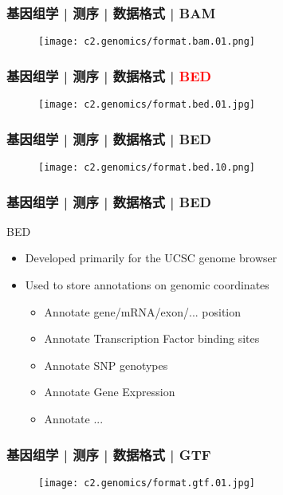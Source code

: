 \begin{frame}
  \frametitle{基因组学 | 测序 | 数据格式 | BAM}
  \begin{figure}
    \centering
    \texttt{[image: c2.genomics/format.bam.01.png]}
  \end{figure}
\end{frame}
    
\begin{frame}
  \frametitle{基因组学 | 测序 | 数据格式 | \textcolor{red}{BED}}
  \begin{figure}
    \centering
    \texttt{[image: c2.genomics/format.bed.01.jpg]}
  \end{figure}
\end{frame}

\begin{frame}
  \frametitle{基因组学 | 测序 | 数据格式 | BED}
  \begin{figure}
    \centering
    \texttt{[image: c2.genomics/format.bed.10.png]}
  \end{figure}
\end{frame}

\begin{frame}
  \frametitle{基因组学 | 测序 | 数据格式 | BED}
  \begin{block}{BED}
    \begin{itemize}
      \item Developed primarily for the UCSC genome browser
      \item Used to store annotations on genomic coordinates
        \begin{itemize}
          \item Annotate gene/mRNA/exon/... position
          \item Annotate Transcription Factor binding sites
          \item Annotate SNP genotypes
          \item Annotate Gene Expression
          \item Annotate ...
        \end{itemize}
    \end{itemize}
  \end{block}
\end{frame}
    
\begin{frame}
  \frametitle{基因组学 | 测序 | 数据格式 | GTF}
  \begin{figure}
    \centering
    \texttt{[image: c2.genomics/format.gtf.01.jpg]}
  \end{figure}
\end{frame}
    
